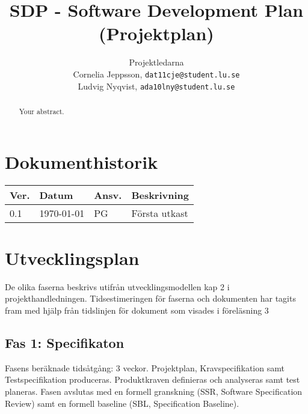 \documentclass[a4paper]{article}
\title{SDP - Software Development Plan (Projektplan)}
\author{Projektledarna\\Cornelia Jeppsson, \texttt{dat11cje@student.lu.se}\\
Ludvig Nyqvist, \texttt{ada10lny@student.lu.se}}
\begin{document}
\maketitle
\thispagestyle{fancy}

\begin{abstract}
Your abstract.
\end{abstract}



\tableofcontents
\newpage

\section*{Dokumenthistorik}
\begin{tabular}{ l l l l }
Ver. & Datum & Ansv. & Beskrivning \\\hline
0.1 & \today & PG & Första utkast
\end{tabular}


\section{Utvecklingsplan}

De olika faserna beskrivs utifrån utvecklingsmodellen kap 2 i projekthandledningen\cite{projekthandledning}. Tidsestimeringen för faserna och dokumenten har tagits fram med hjälp från tidslinjen för dokument som visades i föreläsning 3\cite{dokumenttidslinje}
\begin{comment}

En utvecklingsplan som anger fasernas tidsbehov och händelser av betydelse (granskningar och baselines). I utvecklingsplanen beskrivs också eventuell anpassning av utvecklingsmodellen samt dokument till projektet (eng. tailoring)

Det ska finnas referenser till utvecklingsmodellen kap 2 i boken och beskrivning av eventuella anpassningar.
\end{comment}

\subsection{Fas 1: Specifikaton}
Fasens beräknade tidsåtgång: 3 veckor.\newline
Projektplan, Kravspecifikation samt Testspecifikation produceras. Produktkraven definieras och analyseras samt test planeras. Fasen avslutas med en formell granskning (SSR, Software Specification Review) samt en formell baseline (SBL, Specification Baseline).
\end{document}
